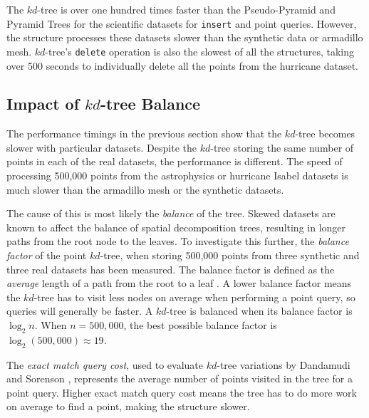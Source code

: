The $kd$-tree is over one hundred times faster than the Pseudo-Pyramid and Pyramid Trees for the scientific datasets for \texttt{insert} and point queries. However, the structure processes these datasets slower than the synthetic data or armadillo mesh. $kd$-tree's \texttt{delete} operation is also the slowest of all the structures, taking over 500 seconds to individually delete all the points from the hurricane dataset.

\subsection{Impact of $kd$-tree Balance}

The performance timings in the previous section show that the $kd$-tree becomes slower with particular datasets. Despite the $kd$-tree storing the same number of points in each of the real datasets, the performance is different. The speed of processing 500,000 points from the astrophysics or hurricane Isabel datasets is much slower than the armadillo mesh or the synthetic datasets. 

The cause of this is most likely the \textit{balance} of the tree. Skewed datasets are known to affect the balance of spatial decomposition trees, resulting in longer paths from the root node to the leaves. To investigate this further, the \textit{balance factor} of the point $kd$-tree, when storing 500,000 points from three synthetic and three real datasets has been measured. The balance factor is defined as the \textit{average} length of a path from the root to a leaf \cite{kdtree-v-bdtree}. A lower balance factor means the $kd$-tree has to visit less nodes on average when performing a point query, so queries will generally be faster. A $kd$-tree is balanced when its balance factor is $\log_2 n$. When $n = 500,000$, the best possible balance factor is $\log_2 (500,000) \approx 19$.

The \textit{exact match query cost}, used to evaluate $kd$-tree variations by Dandamudi and Sorenson \cite{kdtree-v-bdtree}, represents the average number of points visited in the tree for a point query. Higher exact match query cost means the tree has to do more work on average to find a point, making the structure slower.

